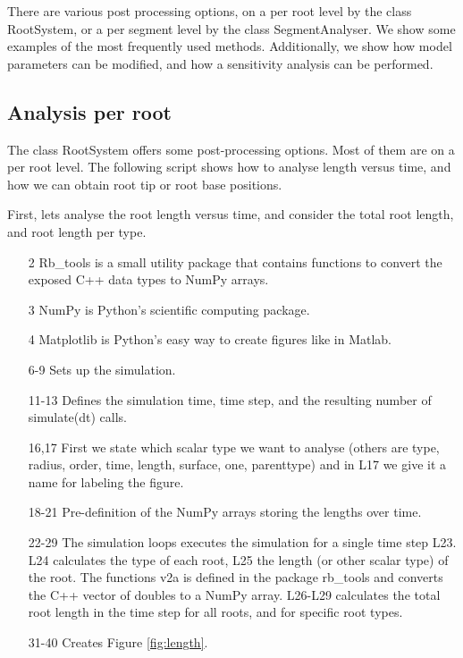 \documentclass[a4paper]{article}
\begin{document}
There are various post processing options, on a per root level by the class RootSystem, or a per segment level by the class SegmentAnalyser.
We show some examples of the most frequently used methods. Additionally, we show how model parameters can be modified, 
and how a sensitivity analysis can be performed. 

\subsection{Analysis per root}

The class RootSystem offers some post-processing options. Most of them are on a per root level. 
The following script shows how to analyse length versus time, and how we can obtain root tip or root base positions. 

First, lets analyse the root length versus time, and consider the total root length, and root length per type. 



\begin{itemize}

\item[2] Rb\_tools is a small utility package that contains functions to convert the exposed C++ data types to NumPy arrays. 
\item[3] NumPy is Python's scientific computing package.
\item[4] Matplotlib is Python's easy way to create figures like in Matlab.

\item[6-9] Sets up the simulation.

\item[11-13] Defines the simulation time, time step, and the resulting number of simulate(dt) calls. 

\item[16,17] First we state which scalar type we want to analyse (others are type, radius, order, time, length, surface, one, parenttype) and in L17 we give it a name for labeling the figure. 

\item[18-21] Pre-definition of the NumPy arrays storing the lengths over time. 

\item[22-29] The simulation loops executes the simulation for a single time step L23. L24 calculates the type of each root, L25 the length (or other scalar type) of the root. 
The functions v2a is defined in the package rb\_tools and converts the C++ vector of doubles to a NumPy array. L26-L29 calculates the total root length in the time step for all roots, and for specific root types.

\item[31-40] Creates Figure \ref{fig:length}.

\end{itemize}
\end{document}
